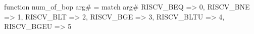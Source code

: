 function num_of_bop arg# = match arg# {
  RISCV_BEQ => 0,
  RISCV_BNE => 1,
  RISCV_BLT => 2,
  RISCV_BGE => 3,
  RISCV_BLTU => 4,
  RISCV_BGEU => 5
}
